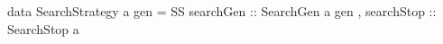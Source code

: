 data SearchStrategy a gen =
  SS { searchGen  :: SearchGen a gen
     , searchStop :: SearchStop a }
